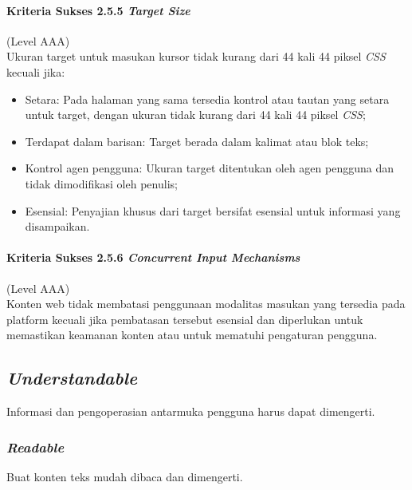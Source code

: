 \documentclass[a4paper,twoside]{article}
\begin{document}
\begin{enumerate}
		\paragraph{Kriteria Sukses 2.5.5 \textit{Target Size}}
		\label{sec:kriteria_sukses_2.5.5}
		(Level AAA)\\

		Ukuran target untuk masukan kursor tidak kurang dari 44 kali 44 piksel \textit{CSS} kecuali jika:

		\begin{itemize}
			\item Setara: Pada halaman yang sama tersedia kontrol atau tautan yang setara untuk target, dengan ukuran tidak kurang dari 44 kali 44 piksel \textit{CSS};  
			\item Terdapat dalam barisan: Target berada dalam kalimat atau blok teks;
			\item Kontrol agen pengguna: Ukuran target ditentukan oleh agen pengguna dan tidak dimodifikasi oleh penulis;
			\item Esensial: Penyajian khusus dari target bersifat esensial untuk informasi yang disampaikan.
		\end{itemize}

		\paragraph{Kriteria Sukses 2.5.6 \textit{Concurrent Input Mechanisms}}
		\label{sec:kriteria_sukses_2.5.6}
		(Level AAA)\\

		Konten web tidak membatasi penggunaan modalitas masukan yang tersedia pada platform kecuali jika pembatasan tersebut esensial dan diperlukan untuk memastikan keamanan konten atau untuk mematuhi pengaturan pengguna.


		\subsection*{\textit{Understandable}}
		\label{sec:understandable}
		Informasi dan pengoperasian antarmuka pengguna harus dapat dimengerti.

		\subsubsection*{\textit{Readable}}
		\label{sec:readable}
		Buat konten teks mudah dibaca dan dimengerti.


\end{enumerate}
\end{document}
